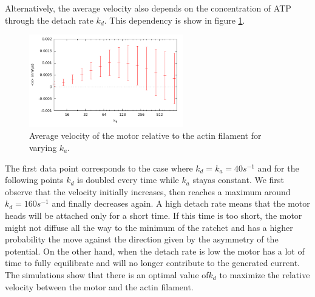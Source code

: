 \documentclass[aps,pre,onecolumn,showpacs,showkeys,a4paper]{revtex4}
\begin{document}
Alternatively, the average velocity also depends on the concentration of ATP through the detach rate $k_{d}$. 
This dependency is show in figure \ref{Fig: v_k}.
\begin{figure}[h]
\centering
\includegraphics[width=0.6\textwidth,height=!]{v_k}
\caption{Average velocity of the motor relative to the actin filament for varying $k_{a}$.}
\label{Fig: v_k} 
\end{figure}
The first data point corresponds to the case where $k_{d} = k_{a} = 40 s^{-1}$ and for the following points $k_{d}$ is doubled every time while $k_{a}$ stayas constant. 
We first observe that the velocity initially increases, then reaches a maximum around $k_{d} = 160 s^{-1}$ and finally decreases again. 
A high detach rate means that the motor heads will be attached only for a short time. 
If this time is too short, the motor might not diffuse all the way to the minimum of the ratchet and has a higher probability the move against the direction given by the asymmetry of the potential. 
On the other hand, when the detach rate is low the motor has a lot of time to fully equilibrate and will no longer contribute to the generated current. 
The simulations show that there is an optimal value of$k_{d}$ to maximize the relative velocity between the motor and the actin filament. 
\end{document}
